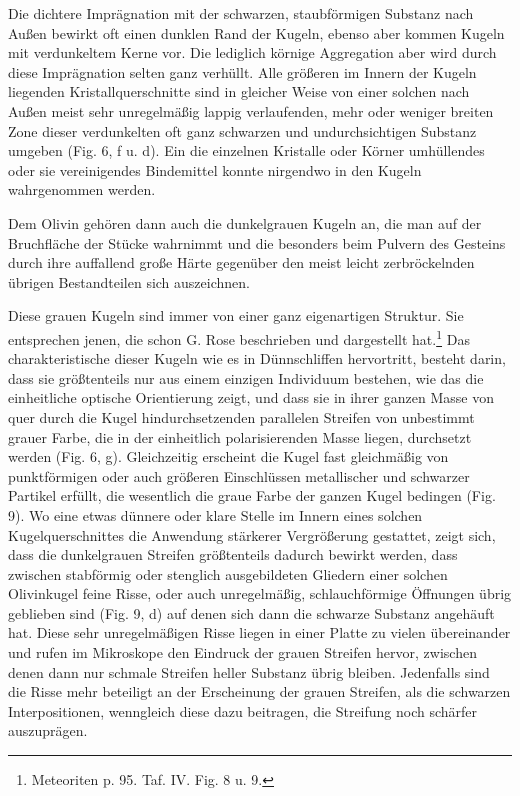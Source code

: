 \documentclass[a4paper, 11pt, oneside]{article}
\begin{document}
Die dichtere Imprägnation mit der schwarzen, staubförmigen Substanz nach Außen bewirkt oft einen dunklen Rand der Kugeln, ebenso aber kommen Kugeln mit verdunkeltem Kerne vor. Die lediglich körnige Aggregation aber wird durch diese Imprägnation selten ganz verhüllt. Alle größeren im Innern der Kugeln liegenden Kristallquerschnitte sind in gleicher Weise von einer solchen nach Außen meist sehr unregelmäßig lappig verlaufenden, mehr oder weniger breiten Zone dieser verdunkelten oft ganz schwarzen und undurchsichtigen Substanz umgeben (Fig. 6, f u. d). Ein die einzelnen Kristalle oder Körner umhüllendes oder sie vereinigendes Bindemittel konnte nirgendwo in den Kugeln wahrgenommen werden.

Dem Olivin gehören dann auch die dunkelgrauen Kugeln an, die man auf der Bruchfläche der Stücke wahrnimmt und die besonders beim Pulvern des Gesteins durch ihre auffallend große Härte gegenüber den meist leicht zerbröckelnden übrigen Bestandteilen sich auszeichnen.

Diese grauen Kugeln sind immer von einer ganz eigenartigen Struktur. Sie entsprechen jenen, die schon G. Rose beschrieben und dargestellt hat.\footnote{Meteoriten p. 95. Taf. IV. Fig. 8 u. 9.} Das charakteristische dieser Kugeln wie es in Dünnschliffen hervortritt, besteht darin, dass sie größtenteils nur aus einem einzigen Individuum bestehen, wie das die einheitliche optische Orientierung zeigt, und dass sie in ihrer ganzen Masse von quer durch die Kugel hindurchsetzenden parallelen Streifen von unbestimmt grauer Farbe, die in der einheitlich polarisierenden Masse liegen, durchsetzt werden (Fig. 6, g). Gleichzeitig erscheint die Kugel fast gleichmäßig von punktförmigen oder auch größeren Einschlüssen metallischer und schwarzer Partikel erfüllt, die wesentlich die graue Farbe der ganzen Kugel bedingen (Fig. 9). Wo eine etwas dünnere oder klare Stelle im Innern eines solchen Kugelquerschnittes die Anwendung stärkerer Vergrößerung gestattet, zeigt sich, dass die dunkelgrauen Streifen größtenteils dadurch bewirkt werden, dass zwischen stabförmig oder stenglich ausgebildeten Gliedern einer solchen Olivinkugel feine Risse, oder auch unregelmäßig, schlauchförmige Öffnungen übrig geblieben sind (Fig. 9, d) auf denen sich dann die schwarze Substanz angehäuft hat. Diese sehr unregelmäßigen Risse liegen in einer Platte zu vielen übereinander und rufen im Mikroskope den Eindruck der grauen Streifen hervor, zwischen denen dann nur schmale Streifen heller Substanz übrig bleiben. Jedenfalls sind die Risse mehr beteiligt an der Erscheinung der grauen Streifen, als die schwarzen Interpositionen, wenngleich diese dazu beitragen, die Streifung noch schärfer auszuprägen.
\end{document}
